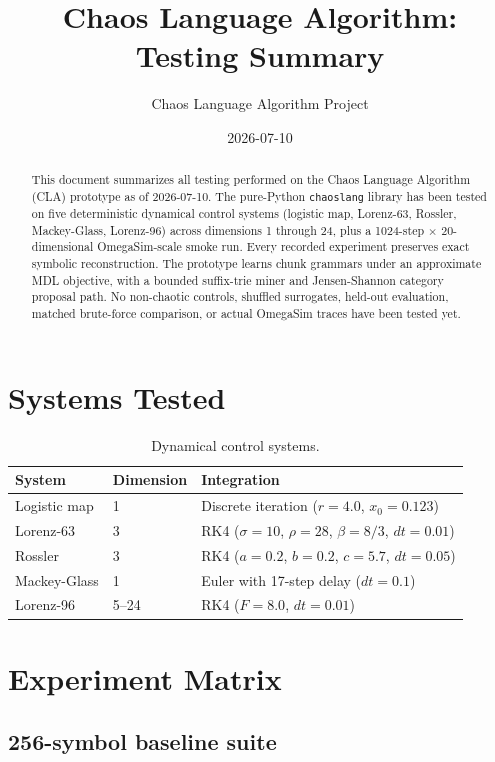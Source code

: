 \documentclass[11pt]{article}
\title{Chaos Language Algorithm: Testing Summary}
\author{Chaos Language Algorithm Project}
\date{2026-07-10}
\begin{document}
\maketitle

\begin{abstract}
This document summarizes all testing performed on the Chaos Language Algorithm (CLA) prototype as of 2026-07-10. The pure-Python \texttt{chaoslang} library has been tested on five deterministic dynamical control systems (logistic map, Lorenz-63, Rossler, Mackey-Glass, Lorenz-96) across dimensions 1 through 24, plus a 1024-step $\times$ 20-dimensional OmegaSim-scale smoke run. Every recorded experiment preserves exact symbolic reconstruction. The prototype learns chunk grammars under an approximate MDL objective, with a bounded suffix-trie miner and Jensen-Shannon category proposal path. No non-chaotic controls, shuffled surrogates, held-out evaluation, matched brute-force comparison, or actual OmegaSim traces have been tested yet.
\end{abstract}

\section{Systems Tested}

\begin{table}[ht]
\centering
\begin{tabular}{lll}
\toprule
System & Dimension & Integration \\
\midrule
Logistic map & 1 & Discrete iteration ($r{=}4.0$, $x_0{=}0.123$) \\
Lorenz-63 & 3 & RK4 ($\sigma{=}10$, $\rho{=}28$, $\beta{=}8/3$, $dt{=}0.01$) \\
Rossler & 3 & RK4 ($a{=}0.2$, $b{=}0.2$, $c{=}5.7$, $dt{=}0.05$) \\
Mackey-Glass & 1 & Euler with 17-step delay ($dt{=}0.1$) \\
Lorenz-96 & 5--24 & RK4 ($F{=}8.0$, $dt{=}0.01$) \\
\bottomrule
\end{tabular}
\caption{Dynamical control systems.}
\end{table}

\section{Experiment Matrix}

\subsection{256-symbol baseline suite}
\end{document}
